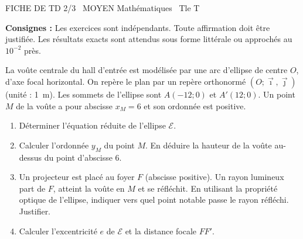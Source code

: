 \documentclass[11pt]{article}
\begin{document}
\begin{tcolorbox}[enhanced,colback=popink,colframe=popink,arc=10pt,boxrule=0pt,left=12pt,right=12pt,top=9pt,bottom=9pt]
{\color{white}\popxbold\small FICHE DE TD 2/3 \textbullet\ MOYEN \hfill Mathématiques \textbullet\ Tle T\par}
\end{tcolorbox}
\vspace{4pt}
\noindent\textbf{Consignes :} Les exercices sont indépendants. Toute affirmation doit être justifiée. Les résultats exacts sont attendus sous forme littérale ou approchés au $10^{-2}$ près.

\begin{exercice}
La voûte centrale du hall d'entrée est modélisée par une arc d'ellipse de centre $O$, d'axe focal horizontal. On repère le plan par un repère orthonormé $(O;\vec{\imath},\vec{\jmath})$ (unité : \SI{1}{m}). Les sommets de l'ellipse sont $A(-12;0)$ et $A'(12;0)$. Un point $M$ de la voûte a pour abscisse $x_M = 6$ et son ordonnée est positive.
\begin{enumerate}
    \item Déterminer l'équation réduite de l'ellipse $\mathcal{E}$.
    \item Calculer l'ordonnée $y_M$ du point $M$. En déduire la hauteur de la voûte au-dessus du point d'abscisse $6$.
    \item Un projecteur est placé au foyer $F$ (abscisse positive). Un rayon lumineux part de $F$, atteint la voûte en $M$ et se réfléchit. En utilisant la propriété optique de l'ellipse, indiquer vers quel point notable passe le rayon réfléchi. Justifier.
    \item Calculer l'excentricité $e$ de $\mathcal{E}$ et la distance focale $FF'$.
\end{enumerate}
\end{exercice}
\end{document}
